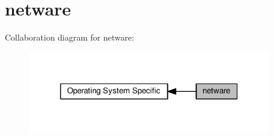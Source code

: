 \hypertarget{group__APACHE__OS__NETWARE}{}\section{netware}
\label{group__APACHE__OS__NETWARE}
Collaboration diagram for netware\+:
\nopagebreak
\begin{figure}[H]
\begin{center}
\leavevmode
\includegraphics[width=301pt]{group__APACHE__OS__NETWARE}
\end{center}
\end{figure}
